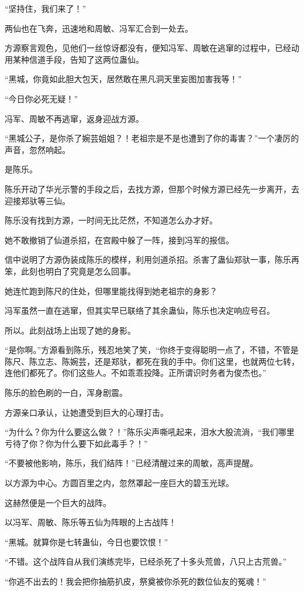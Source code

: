 \begin{this_body}
“坚持住，我们来了！”

两仙也在飞奔，迅速地和周敏、冯军汇合到一处去。

方源察言观色，见他们一丝惊讶都没有，便知冯军、周敏在逃窜的过程中，已经动用某种信道手段，告知了这两位蛊仙。

“黑城，你竟如此胆大包天，居然敢在黑凡洞天里妄图加害我等！”

“今日你必死无疑！”

冯军、周敏不再逃窜，返身迎战方源。

“黑城公子，是你杀了婉芸姐姐？！老祖宗是不是也遭到了你的毒害？”一个凄厉的声音，忽然响起。

是陈乐。

陈乐开动了华光示警的手段之后，去找方源，但那个时候方源已经先一步离开，去迎接郑驮等三仙。

陈乐没有找到方源，一时间无比茫然，不知道怎么办才好。

她不敢撤销了仙道杀招，在宫殿中躲了一阵，接到冯军的报信。

信中说明了方源伪装成陈乐的模样，利用剑道杀招。杀害了蛊仙郑驮一事，陈乐再笨，此刻也明白了究竟是怎么回事。

她连忙跑到陈尺的住处，但哪里能找得到她老祖宗的身影？

冯军虽然一直在逃窜，但其实早已联络了其余蛊仙，陈乐也决定响应号召。

所以。此刻战场上出现了她的身影。

“是你啊。”方源看到陈乐，残忍地笑了笑，“你终于变得聪明一点了，不错，不管是陈尺、陈立志、陈婉芸，还是郑驮，都死在我的手中。你们这里，也就两位七转，连他们都死了。你们这些人。不如乖乖投降。正所谓识时务者为俊杰也。”

陈乐的脸色刷的一白，浑身剧震。

方源亲口承认，让她遭受到巨大的心理打击。

“为什么？你为什么要这么做？！”陈乐尖声嘶吼起来，泪水大股流淌，“我们哪里亏待了你？你为什么要下如此毒手？！”

“不要被他影响，陈乐，我们结阵！”已经清醒过来的周敏，高声提醒。

以方源为中心。方圆百里之内，忽然罩起一座巨大的碧玉光球。

这赫然便是一个巨大的战阵。

以冯军、周敏、陈乐等五仙为阵眼的上古战阵！

“黑城。就算你是七转蛊仙，今日也要饮恨！”

“不错。这个战阵自从我们演练完毕，已经杀死了十多头荒兽，八只上古荒兽。”

“你逃不出去的！我会把你抽筋扒皮，祭奠被你杀死的数位仙友的冤魂！”


\end{this_body}
